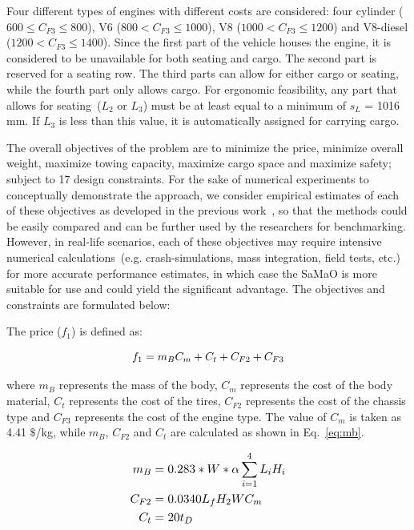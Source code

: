 \documentclass[twocolumn,10pt]{asme2ej}
\begin{document}
Four different types of engines with different costs are considered: four cylinder ($600 \le C_{F3} \le 800$), V6 ($800 < C_{F3} \le 1000$), V8 ($1000 < C_{F3} \le 1200$) and V8-diesel ($1200 < C_{F3} \le 1400$). Since the first part of the vehicle houses the engine, it is considered to be unavailable for both seating and cargo. The second part is reserved for a seating row. The third parts can allow for either cargo or seating, while the fourth part only allows cargo. For ergonomic feasibility, any part that allows for seating~($L_2$ or $L_3$) must be at least equal to a minimum of  $s_L$ = 1016 mm. If $L_3$ is less than this value, it is automatically assigned for carrying cargo. 

The overall objectives of the problem are to minimize the price, minimize overall weight, maximize towing capacity, maximize cargo space and maximize safety; subject to 17 design constraints. For the sake of numerical experiments to conceptually demonstrate the approach, we consider empirical estimates of each of these objectives as developed in the previous work~\cite{KHTbarnum2010car}, so that the methods could be easily compared and can be further used by the researchers for benchmarking. However, in real-life scenarios, each of these objectives may require intensive numerical calculations~(e.g. crash-simulations, mass integration, field tests, etc.) for more accurate performance estimates, in which case the SaMaO is more suitable for use and could yield the significant advantage. The objectives and constraints are formulated below:  

The price ($f_1$) is defined as:

\begin{equation}\footnotesize
f_1 = m_BC_m + C_t + C_{F2} + C_{F3}
\label{eq:f1}
\end{equation}

where $m_B$ represents the mass of the body, $C_m$ represents the cost of the body material, $C_t$ represents the cost of the tires, $C_{F2}$ represents the cost of the chassis type and $C_{F3}$ represents the cost of the engine type. The value of $C_m$ is taken as 4.41 $\$$/kg, while $m_B$, $C_{F2}$ and $C_t$ are calculated as shown in Eq.~\ref{eq:mb}.

\begin{equation}\footnotesize
\begin{aligned}
m_B & = 0.283*W*\alpha\sum_{i = 1}^4 L_iH_i\\
C_{F2} & = 0.0340 L_f H_2 W C_m\\
C_t & = 20 t_D
\end{aligned}
\label{eq:mb}
\end{equation}
\end{document}
